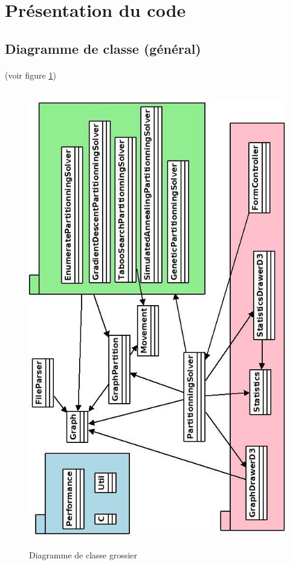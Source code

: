 \documentclass[12pt]{article}
\begin{document}
\section{Présentation du code}

\subsection{Diagramme de classe (général)}

\paragraph{}(voir figure \ref{fig:classdiagram})

\begin{figure}[!h]
	\begin{center}
		\includegraphics[height=20cm]{pictures/classeGraph.jpeg}
	\end{center}
	\caption{Diagramme de classe grossier \label{fig:classdiagram}}
\end{figure}
\end{document}
